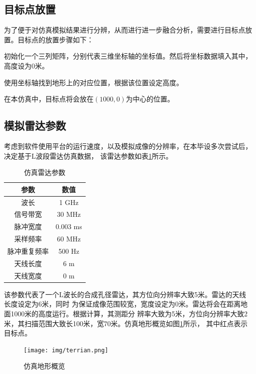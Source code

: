 \documentclass{xduugthesis}
\begin{document}
\subsection{目标点放置}
为了便于对仿真模拟结果进行分辨，从而进行进一步融合分析，需要进行目标点放置。目标点的放置步骤如下：\par
\begin{compactenum}
	\item 初始化一个三列矩阵，分别代表三维坐标轴的坐标值。然后将坐标数据填入其中，高度设为0米。
	\item 使用坐标轴找到地形上的对应位置，根据该位置设定高度。
\end{compactenum}\par
在本仿真中，目标点将会放在$(1000,0)$为中心的位置。
\subsection{模拟雷达参数}
考虑到软件使用平台的运行速度，以及模拟成像的分辨率，在本毕设多次尝试后，决定基于L波段雷达仿真数据，
该雷达参数如表\ref{Radar_Parameter_Table}所示。\par
\begin{table}[ht!]
	\begin{center}
		\caption{仿真雷达参数}\label{Radar_Parameter_Table}
		\begin{tabular}{|c|c|}
			\hline
			参数 & 数值 \\
			\hline
			波长 & 1 GHz \\
			\hline
			信号带宽 & 30 MHz \\
			\hline
			脉冲宽度 & 0.003 ms  \\
			\hline
			采样频率 & 60 MHz \\
			\hline
			脉冲重复频率 & 500 Hz \\
			\hline
			天线长度 & 6 m \\
			\hline
			天线宽度 & 0 m \\
			\hline
		\end{tabular}
	\end{center}
\end{table}
\vspace{-1em} 
该参数代表了一个L波长的合成孔径雷达，其方位向分辨率大致5米。雷达的天线长度设定为6米，同时
为保证成像范围较宽，宽度设定为0米。雷达将会在距离地面1000米的高度运行。根据计算，其测距分
辨率大致为5米，方位向分辨率大致2米，其扫描范围大致长100米，宽70米。仿真地形概览如图\ref{terrain_image}所示，
其中红点表示目标点。
\begin{figure}[!htb]
	\centering
	\texttt{[image: img/terrian.png]}
	\caption{仿真地形概览}\label{terrain_image}
\end{figure}
\end{document}

